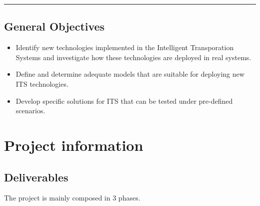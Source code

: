 \documentclass[]{book}
\providecommand{\tightlist}{%
  \setlength{\itemsep}{0pt}\setlength{\parskip}{0pt}}
\theoremstyle{definition}
\theoremstyle{definition}
\theoremstyle{definition}
\theoremstyle{remark}
\begin{document}
\begin{center}\rule{0.5\linewidth}{\linethickness}\end{center}

\hypertarget{general-objectives}{%
\section*{General Objectives}\label{general-objectives}}

\begin{itemize}
\tightlist
\item
  Identify new technologies implemented in the Intelligent Transporation
  Systems and investigate how these technologies are deployed in real
  systems.
\item
  Define and determine adequate models that are suitable for deploying
  new ITS technologies.
\item
  Develop specific solutions for ITS that can be tested under
  pre-defined scenarios.
\end{itemize}

\hypertarget{project-information}{%
\chapter*{Project information}\label{project-information}}

\hypertarget{deliverables}{%
\section*{Deliverables}\label{deliverables}}

The project is mainly composed in 3 phases.
\end{document}
